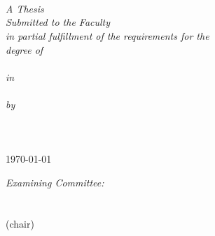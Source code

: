 
\begin{titlepage}
\begin{center}

\HRule \\[0.5cm] %

{\large \bfseries \ttitle} %
\HRule %
\linespread{1.1} \\~\\[0.2cm]
  \textit{A Thesis\\Submitted to the Faculty\\in partial fulfillment of the requirements for the\\ degree of\\ \degreename}\\[0.2cm] %
\textit{in}\\[0.3cm]
\fieldname\\[0.3cm] %
 
\large\emph{by}\\\Large
\textsc{\authornames}\\ %
 \textsc{\large \univname}\\ %
 \normalsize \citystatenames\\
 { \today}\\[2.0 cm] %


\begin{minipage}{1.0\textwidth}
\begin{flushright} \large
\normalsize \emph{Examining Committee:} \\~\\
\underline{\hspace{6cm}}\\\small (chair) \textsc{\commchairname} \\~\\~ \underline{\hspace{6cm}}\\ \small\textsc{\commadvtwoname} \\~\\~ \underline{\hspace{6cm}}\\ \small\textsc{\commadvthreename}  
\end{flushright}
\end{minipage}\\[1cm]


\end{center}
\end{titlepage}

